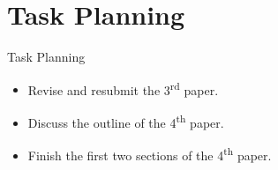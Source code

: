 
\section{Task Planning}
\begin{frame}{Task Planning}
    \begin{itemize}
      \item Revise and resubmit the 3\textsuperscript{rd} paper.
      \item Discuss the outline of the 4\textsuperscript{th} paper.
      \item Finish the first two sections of the 4\textsuperscript{th} paper.
    \end{itemize}
\end{frame} 
